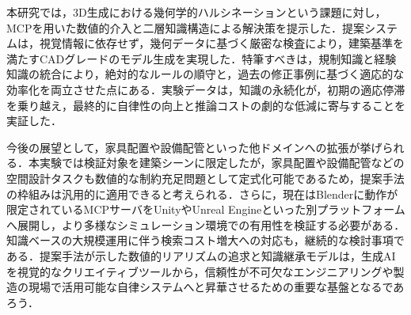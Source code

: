 \documentclass[dvipdfmx, a4paper, 9pt]{deimj}
\begin{document}
本研究では，3D生成における幾何学的ハルシネーションという課題に対し，MCPを用いた数値的介入と二層知識構造による解決策を提示した．提案システムは，視覚情報に依存せず，幾何データに基づく厳密な検査により，建築基準を満たすCADグレードのモデル生成を実現した．特筆すべきは，規制知識と経験知識の統合により，絶対的なルールの順守と，過去の修正事例に基づく適応的な効率化を両立させた点にある．実験データは，知識の永続化が，初期の適応停滞を乗り越え，最終的に自律性の向上と推論コストの劇的な低減に寄与することを実証した．

今後の展望として，家具配置や設備配管といった他ドメインへの拡張が挙げられる．本実験では検証対象を建築シーンに限定したが，家具配置や設備配管などの空間設計タスクも数値的な制約充足問題として定式化可能であるため，提案手法の枠組みは汎用的に適用できると考えられる．さらに，現在はBlenderに動作が限定されているMCPサーバをUnityやUnreal Engineといった別プラットフォームへ展開し，より多様なシミュレーション環境での有用性を検証する必要がある．知識ベースの大規模運用に伴う検索コスト増大への対応も，継続的な検討事項である．提案手法が示した数値的リアリズムの追求と知識継承モデルは，生成AIを視覚的なクリエイティブツールから，信頼性が不可欠なエンジニアリングや製造の現場で活用可能な自律システムへと昇華させるための重要な基盤となるであろう．




\end{document}
